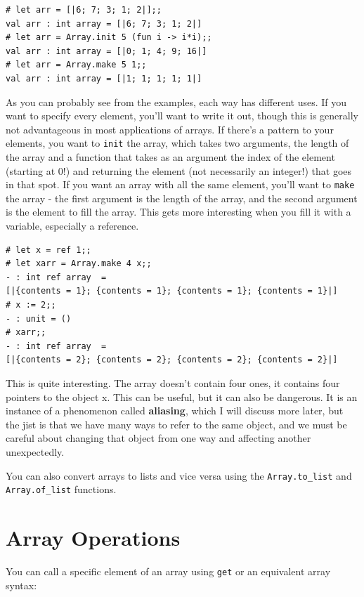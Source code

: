 \documentclass[10pt]{book}
\begin{document}
{\beforeverb
\begin{verbatim}
# let arr = [|6; 7; 3; 1; 2|];;
val arr : int array = [|6; 7; 3; 1; 2|]
# let arr = Array.init 5 (fun i -> i*i);;
val arr : int array = [|0; 1; 4; 9; 16|]
# let arr = Array.make 5 1;;
val arr : int array = [|1; 1; 1; 1; 1|]
\end{verbatim}
\afterverb
As you can probably see from the examples, each way has different uses. If you want to specify every element, you'll want to write it out, though this is generally not advantageous in most applications of arrays. If there's a pattern to your elements, you want to {\tt init} the array, which takes two arguments, the length of the array and a function that takes as an argument the index of the element (starting at 0!) and returning the element (not necessarily an integer!) that goes in that spot. If you want an array with all the same element, you'll want to {\tt make} the array - the first argument is the length of the array, and the second argument is the element to fill the array. This gets more interesting when you fill it with a variable, especially a reference.

\beforeverb
\begin{verbatim}
# let x = ref 1;;
# let xarr = Array.make 4 x;;
- : int ref array  = 
[|{contents = 1}; {contents = 1}; {contents = 1}; {contents = 1}|]
# x := 2;;
- : unit = ()
# xarr;;
- : int ref array  = 
[|{contents = 2}; {contents = 2}; {contents = 2}; {contents = 2}|]
\end{verbatim}
\afterverb

This is quite interesting. The array doesn't contain four ones, it contains
four pointers to the object x. This can be useful, but it can also be dangerous.
It is an instance of a phenomenon called {\bf aliasing}, which I will discuss more
later, but the jist is that we have many ways to refer to the same object, and we 
must be careful about changing that object from one way and affecting another unexpectedly.

You can also convert arrays to lists and vice versa using 
the {\tt \verb"Array.to_list"} and {\tt 
\verb"Array.of_list"} functions.

\section{Array Operations}

You can call a specific element of an array using {\tt get} 
or an equivalent array syntax:

}
\end{document}
